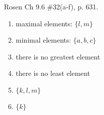 \begin{questions}
\bonusquestion[3] Rosen Ch 9.6 \#32(a-f), p. 631.
    \ifprintanswers
        \vspace{-10pt}
    \fi
    \begin{solution}
    \begin{enumerate}[label=(\alph*),itemsep=0pt,parsep=0pt,topsep=0pt,partopsep=0pt]
        \item maximal elements: $\{ l, m\}$
        \item minimal elements: $\{ a, b, c \}$
        \item there is no greatest element
        \item there is no least element
        \item $\{ k, l, m\}$
        \item $\{ k \}$
    \end{enumerate}
    \end{solution}





\end{questions}
